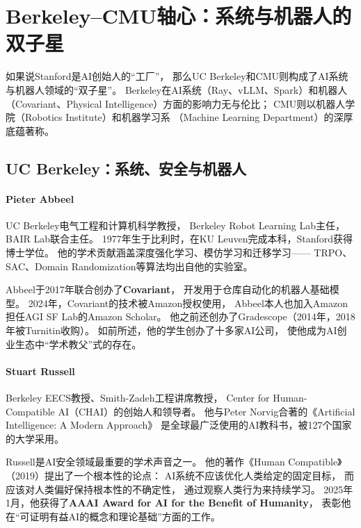 \section{Berkeley--CMU轴心：系统与机器人的双子星}
\label{sec:berkeley-cmu}

如果说Stanford是AI创始人的``工厂''，
那么UC Berkeley和CMU则构成了AI系统与机器人领域的``双子星''。
Berkeley在AI系统（Ray、vLLM、Spark）和机器人
（Covariant、Physical Intelligence）方面的影响力无与伦比；
CMU则以机器人学院（Robotics Institute）和机器学习系
（Machine Learning Department）的深厚底蕴著称。

\subsection{UC Berkeley：系统、安全与机器人}

\paragraph{Pieter Abbeel}
UC Berkeley电气工程和计算机科学教授，
Berkeley Robot Learning Lab主任，BAIR Lab联合主任。
1977年生于比利时，在KU Leuven完成本科，Stanford获得博士学位。
他的学术贡献涵盖深度强化学习、模仿学习和迁移学习——
TRPO、SAC、Domain Randomization等算法均出自他的实验室。

Abbeel于2017年联合创办了\textbf{Covariant}，
开发用于仓库自动化的机器人基础模型。
2024年，Covariant的技术被Amazon授权使用，
Abbeel本人也加入Amazon担任AGI SF Lab的Amazon Scholar。
他之前还创办了Gradescope（2014年，2018年被Turnitin收购）。
如前所述，他的学生创办了十多家AI公司，
使他成为AI创业生态中``学术教父''式的存在。

\paragraph{Stuart Russell}
Berkeley EECS教授、Smith-Zadeh工程讲席教授，
Center for Human-Compatible AI（CHAI）的创始人和领导者。
他与Peter Norvig合著的《Artificial Intelligence: A Modern Approach》
是全球最广泛使用的AI教科书，被127个国家的大学采用。

Russell是AI安全领域最重要的学术声音之一。
他的著作《Human Compatible》（2019）提出了一个根本性的论点：
AI系统不应该优化人类给定的固定目标，
而应该对人类偏好保持根本性的不确定性，
通过观察人类行为来持续学习。
2025年1月，他获得了\textbf{AAAI Award for AI for the Benefit of Humanity}，
表彰他在``可证明有益AI的概念和理论基础''方面的工作。

